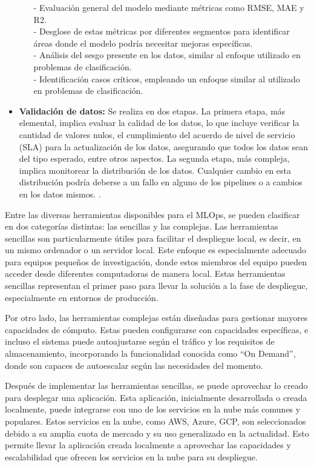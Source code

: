 \begin{itemize}
\begin{enumerate}
- Evaluación general del modelo mediante métricas como RMSE, MAE y R2.\\
- Desglose de estas métricas por diferentes segmentos para identificar áreas donde el modelo podría necesitar mejoras específicas.\\
- Análisis del sesgo presente en los datos, similar al enfoque utilizado en problemas de clasificación.\\
- Identificación casos críticos, empleando un enfoque similar al utilizado en problemas de clasificación.\\
    \end{enumerate}
\item \textbf{Validación de datos:} Se realiza en dos etapas. La primera etapa, más elemental, implica evaluar la calidad de los datos, lo que incluye verificar la cantidad de valores nulos, el cumplimiento del acuerdo de nivel de servicio (SLA) para la actualización de los datos, asegurando que todos los datos sean del tipo esperado, entre otros aspectos. La segunda etapa, más compleja, implica monitorear la distribución de los datos. Cualquier cambio en esta distribución podría deberse a un fallo en alguno de los pipelines o a cambios en los datos mismos. \citep{rivero2022}. 
\end{itemize}

Entre las diversas herramientas disponibles para el MLOps, se pueden clasificar en dos categorías distintas: las sencillas y las complejas. Las herramientas sencillas son particularmente útiles para facilitar el despliegue local, es decir, en un mismo ordenador o un servidor local. Este enfoque es especialmente adecuado para equipos pequeños de investigación, donde estos miembros del equipo pueden acceder desde diferentes computadoras de manera local. Estas herramientas sencillas representan el primer paso para llevar la solución a la fase de despliegue, especialmente en entornos de producción.

Por otro lado, las herramientas complejas están diseñadas para gestionar mayores capacidades de cómputo. Estas pueden configurarse con capacidades específicas, e incluso el sistema puede autoajustarse según el tráfico y los requisitos de almacenamiento, incorporando la funcionalidad conocida como ``On Demand'', donde son capaces de autoescalar según las necesidades del momento. 

Después de implementar las herramientas sencillas, se puede aprovechar lo creado para desplegar una aplicación. Esta aplicación, inicialmente desarrollada o creada localmente, puede integrarse con uno de los servicios en la nube más comunes y populares. Estos servicios en la nube, como AWS, Azure, GCP, son seleccionados debido a su amplia cuota de mercado y su uso generalizado en la actualidad. Esto permite llevar la aplicación creada localmente a aprovechar las capacidades y escalabilidad que ofrecen los servicios en la nube para su despliegue.

